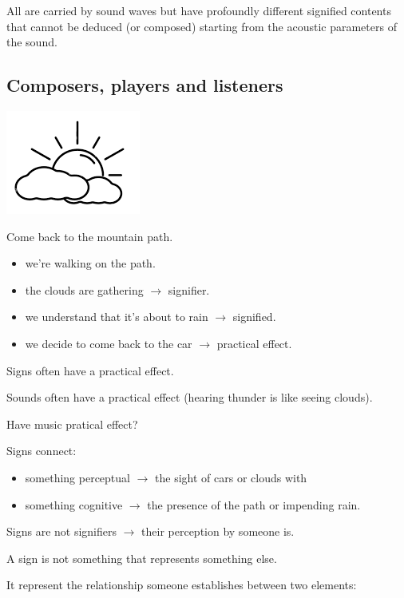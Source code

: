 All are carried by sound waves but have profoundly different signified contents that cannot be deduced (or composed) starting from the acoustic parameters of the sound.

\subsection{Composers, players and listeners }\label{composers-players-and-listeners}

\begin{center}
\includegraphics[scale=0.6]{../img/nuvole.png}
\end{center}

Come back to the mountain path.

\begin{itemize}
\tightlist
\item we're walking on the path.
\item the clouds are gathering \(\rightarrow\) signifier.
\item we understand that it's about to rain \(\rightarrow\) signified.
\item we decide to come back to the car \(\rightarrow\) practical effect.
\end{itemize}

Signs often have a practical effect.

Sounds often have a practical effect (hearing thunder is like seeing clouds).

Have music pratical effect?

Signs connect: 
\begin{itemize}
\tightlist
\item something perceptual \(\rightarrow\) the sight of cars or clouds with 
\item something cognitive \(\rightarrow\) the presence of the path or impending rain.
\end{itemize}

Signs are not signifiers \(\rightarrow\) their perception by someone is.

A sign is not something that represents something else.

It represent the relationship someone establishes between two elements:

